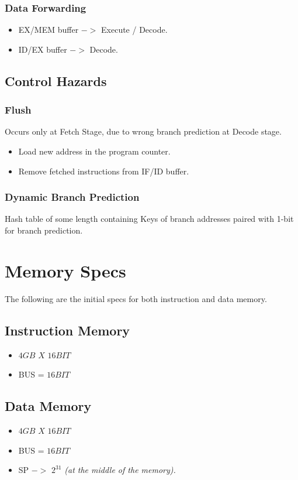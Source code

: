 \documentclass[12pt]{report}
\begin{document}
\subsubsection{Data Forwarding}
\begin{itemize}
    \item EX/MEM buffer $->$ Execute / Decode.
    \item ID/EX buffer $->$ Decode.
\end{itemize}

\subsection{Control Hazards}

\subsubsection{Flush}
Occurs only at Fetch Stage, due to wrong branch prediction at Decode stage.
\begin{itemize}
    \item Load new address in the program counter.
    \item Remove fetched instructions from IF/ID buffer.
\end{itemize}

\subsubsection{Dynamic Branch Prediction}
Hash table of some length containing Keys of branch addresses paired with 1-bit for branch prediction.

\section{Memory Specs}
The following are the initial specs for both instruction and data memory.
\subsection{Instruction Memory}
\begin{itemize}
    \item $4GB$ $X$ $16BIT$
    \item BUS = $16BIT$
\end{itemize}

\subsection{Data Memory}
\begin{itemize}
    \item $4GB$ $X$ $16BIT$
    \item BUS = $16BIT$
    \item SP $->$ $2^{31}$ \emph{(at the middle of the memory).}
\end{itemize}
\end{document}
